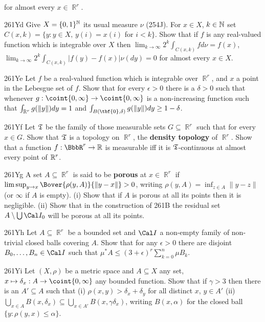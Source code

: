 {\noindent for almost every $x\in\BbbR^r$. 
      
\spheader 261Yd Give $X=\{0,1\}^{\Bbb N}$ its usual measure $\nu$ 
(254J).   For $x\in X$, $k\in\Bbb N$ set 
$C(x,k)=\{y:y\in X,\,y(i)=x(i)$ for $i<k\}$.   Show that if $f$ is any 
real-valued function which is integrable over $X$ then 
$\lim_{k\to\infty}2^k\int_{C(x,k)}fd\nu=f(x)$, 
$\lim_{k\to\infty}2^k\int_{C(x,k)}|f(y)-f(x)|\nu(dy)=0$ for almost every 
$x\in X$. 
      
\spheader 261Ye Let $f$ be a real-valued function which is integrable 
over $\BbbR^r$, and $x$ a point in the Lebesgue set of $f$.   Show that 
for every $\epsilon>0$ there is a $\delta>0$ such that 
whenever 
$g:\coint{0,\infty}\to\coint{0,\infty}$ is a non-increasing function 
such that $\int_{\Bbb R^r}g(\|y\|)dy=1$ and 
$\int_{B(\tbf{0},\delta)}g(\|y\|)dy\ge 1-\delta$.    
      
\spheader 261Yf Let $\frak T$ be the family of those measurable sets 
$G\subseteq\BbbR^r$ such that 
for every $x\in G$. 
Show that $\frak T$ is a topology on $\BbbR^r$, the {\bf density 
topology} of $\BbbR^r$.   Show that a function $f:\BbbR^r\to\Bbb R$ is 
measurable iff it is $\frak T$-continuous at almost every point of 
$\Bbb R^r$. 
      
\spheader 261Yg A set $A\subseteq\BbbR^r$ is said to be {\bf porous} at 
$x\in\BbbR^r$ if $\limsup_{y\to x}\Bover{\rho(y,A)}{\|y-x\|}>0$,  
writing $\rho(y,A)=\inf_{z\in A}\|y-z\|$ (or $\infty$ if $A$ is empty). 
(i) Show that if $A$ is porous at all its points then it is negligible. 
(ii) Show that in the construction of 261B the residual set 
$A\setminus\bigcup\Cal I_0$ will be porous at all its points. 
 
\spheader 261Yh Let $A\subseteq\BbbR^r$ be a bounded set and $\Cal I$ a 
non-empty family of non-trivial closed balls covering $A$.   Show that 
for any $\epsilon>0$ there are disjoint $B_0,\ldots,B_n\in\Cal I$ such 
that $\mu^*A\le(3+\epsilon)^r\sum_{k=0}^n\mu B_k$. 
      
\spheader 261Yi Let $(X,\rho)$ be a metric space and $A\subseteq X$ any 
set, $x\mapsto\delta_x:A\to\coint{0,\infty}$ any bounded function. 
Show that if $\gamma>3$ then there is an $A'\subseteq A$ such that (i) 
$\rho(x,y)>\delta_x+\delta_y$ for all distinct $x$, $y\in A'$ (ii) 
$\bigcup_{x\in A}B(x,\delta_x) 
\subseteq\bigcup_{x\in A'}B(x,\gamma\delta_x)$, writing $B(x,\alpha)$ 
for the closed ball $\{y:\rho(y,x)\le\alpha\}$. 
      
}

